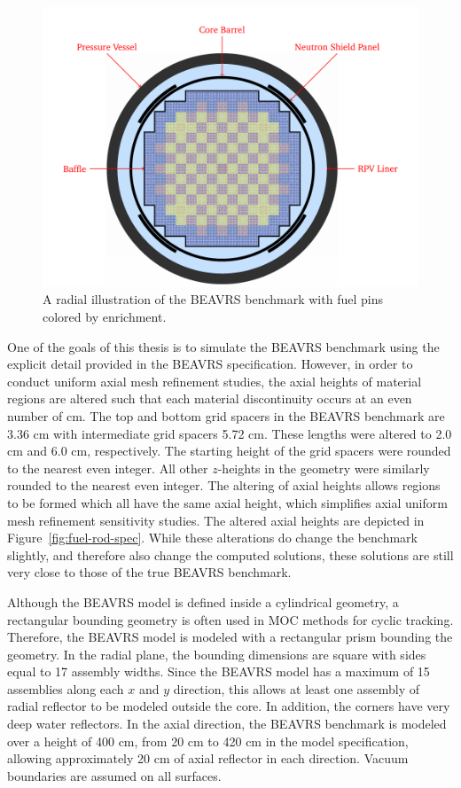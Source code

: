 \begin{figure}[h!]
	\centering
	\includegraphics[width=\linewidth]{figures/beavrs-visual/beavrs-assembly-enrichment.png}
	\caption{A radial illustration of the BEAVRS benchmark with fuel pins colored by enrichment.}
	\label{fig:beavrs-assembly-enrichment}
\end{figure} 

One of the goals of this thesis is to simulate the BEAVRS benchmark using the explicit detail provided in the BEAVRS specification. However, in order to conduct uniform axial mesh refinement studies, the axial heights of material regions are altered such that each material discontinuity occurs at an even number of cm. The top and bottom grid spacers in the BEAVRS benchmark are 3.36 cm with intermediate grid spacers 5.72 cm. These lengths were altered to 2.0 cm and 6.0 cm, respectively. The starting height of the grid spacers were rounded to the nearest even integer. All other $z$-heights in the geometry were similarly rounded to the nearest even integer. The altering of axial heights allows regions to be formed which all have the same axial height, which simplifies axial uniform mesh refinement sensitivity studies. The altered axial heights are depicted in Figure~\ref{fig:fuel-rod-spec}. While these alterations do change the benchmark slightly, and therefore also change the computed solutions, these solutions are still very close to those of the true BEAVRS benchmark.



Although the BEAVRS model is defined inside a cylindrical geometry, a rectangular bounding geometry is often used in \ac{MOC} methods for cyclic tracking. Therefore, the BEAVRS model is modeled with a rectangular prism bounding the geometry. In the radial plane, the bounding dimensions are square with sides equal to 17 assembly widths. Since the BEAVRS model has a maximum of 15 assemblies along each $x$ and $y$ direction, this allows at least one assembly of radial reflector to be modeled outside the core. In addition, the corners have very deep water reflectors. In the axial direction, the BEAVRS benchmark is modeled over a height of 400 cm, from 20 cm to 420 cm in the model specification, allowing approximately 20 cm of axial reflector in each direction. Vacuum boundaries are assumed on all surfaces. 

